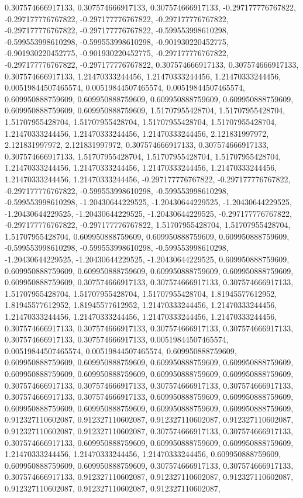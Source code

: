 \documentclass[
  ,man]{apa6}
\begin{document}
0.307574666917133, 0.307574666917133, 0.307574666917133, -0.297177776767822, -0.297177776767822, -0.297177776767822, -0.297177776767822, -0.297177776767822, -0.297177776767822, -0.599553998610298, -0.599553998610298, -0.599553998610298, -0.901930220452775, -0.901930220452775, -0.901930220452775, -0.297177776767822, -0.297177776767822, -0.297177776767822, 0.307574666917133, 0.307574666917133, 0.307574666917133, 1.21470333244456, 1.21470333244456, 1.21470333244456, 0.00519844507465574, 0.00519844507465574,
0.00519844507465574, 0.609950888759609, 0.609950888759609, 0.609950888759609, 0.609950888759609, 0.609950888759609, 0.609950888759609, 1.51707955428704, 1.51707955428704, 1.51707955428704, 1.51707955428704, 1.51707955428704, 1.51707955428704, 1.21470333244456, 1.21470333244456, 1.21470333244456, 2.121831997972, 2.121831997972, 2.121831997972, 0.307574666917133, 0.307574666917133, 0.307574666917133, 1.51707955428704, 1.51707955428704, 1.51707955428704, 1.21470333244456, 1.21470333244456, 1.21470333244456,
1.21470333244456, 1.21470333244456, 1.21470333244456, -0.297177776767822, -0.297177776767822, -0.297177776767822, -0.599553998610298, -0.599553998610298, -0.599553998610298, -1.20430644229525, -1.20430644229525, -1.20430644229525, -1.20430644229525, -1.20430644229525, -1.20430644229525, -0.297177776767822, -0.297177776767822, -0.297177776767822, 1.51707955428704, 1.51707955428704, 1.51707955428704, 0.609950888759609, 0.609950888759609, 0.609950888759609, -0.599553998610298, -0.599553998610298, -0.599553998610298,
-1.20430644229525, -1.20430644229525, -1.20430644229525, 0.609950888759609, 0.609950888759609, 0.609950888759609, 0.609950888759609, 0.609950888759609, 0.609950888759609, 0.307574666917133, 0.307574666917133, 0.307574666917133, 1.51707955428704, 1.51707955428704, 1.51707955428704, 1.81945577612952, 1.81945577612952, 1.81945577612952, 1.21470333244456, 1.21470333244456, 1.21470333244456, 1.21470333244456, 1.21470333244456, 1.21470333244456, 0.307574666917133, 0.307574666917133, 0.307574666917133,
0.307574666917133, 0.307574666917133, 0.307574666917133, 0.00519844507465574, 0.00519844507465574, 0.00519844507465574, 0.609950888759609, 0.609950888759609, 0.609950888759609, 0.609950888759609, 0.609950888759609, 0.609950888759609, 0.609950888759609, 0.609950888759609, 0.609950888759609, 0.307574666917133, 0.307574666917133, 0.307574666917133, 0.307574666917133, 0.307574666917133, 0.307574666917133, 0.609950888759609, 0.609950888759609, 0.609950888759609, 0.609950888759609, 0.609950888759609, 0.609950888759609,
0.912327110602087, 0.912327110602087, 0.912327110602087, 0.912327110602087, 0.912327110602087, 0.912327110602087, 0.307574666917133, 0.307574666917133, 0.307574666917133, 0.609950888759609, 0.609950888759609, 0.609950888759609, 1.21470333244456, 1.21470333244456, 1.21470333244456, 0.609950888759609, 0.609950888759609, 0.609950888759609, 0.307574666917133, 0.307574666917133, 0.307574666917133, 0.912327110602087, 0.912327110602087, 0.912327110602087, 0.912327110602087, 0.912327110602087, 0.912327110602087,
\end{document}
